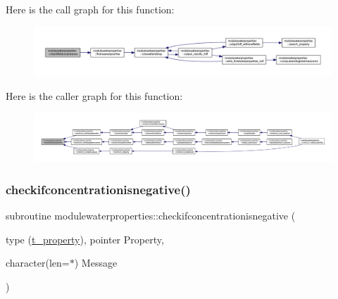 Here is the call graph for this function\+:\nopagebreak
\begin{figure}[H]
\begin{center}
\leavevmode
\includegraphics[width=350pt]{namespacemodulewaterproperties_ae1f665f653d3f72ef388bbb889ec57c9_cgraph}
\end{center}
\end{figure}
Here is the caller graph for this function\+:\nopagebreak
\begin{figure}[H]
\begin{center}
\leavevmode
\includegraphics[width=350pt]{namespacemodulewaterproperties_ae1f665f653d3f72ef388bbb889ec57c9_icgraph}
\end{center}
\end{figure}
\mbox{\label{namespacemodulewaterproperties_a1edbcfe150c3db4a47036d7e4bfcdda3}} 
\subsubsection{\texorpdfstring{checkifconcentrationisnegative()}{checkifconcentrationisnegative()}}
{\footnotesize\ttfamily subroutine modulewaterproperties\+::checkifconcentrationisnegative (\begin{DoxyParamCaption}\item[{type (\mbox{\hyperlink{structmodulewaterproperties_1_1t__property}{t\+\_\+property}}), pointer}]{Property,  }\item[{character(len=$\ast$)}]{Message }\end{DoxyParamCaption})\hspace{0.3cm}{\ttfamily [private]}}


